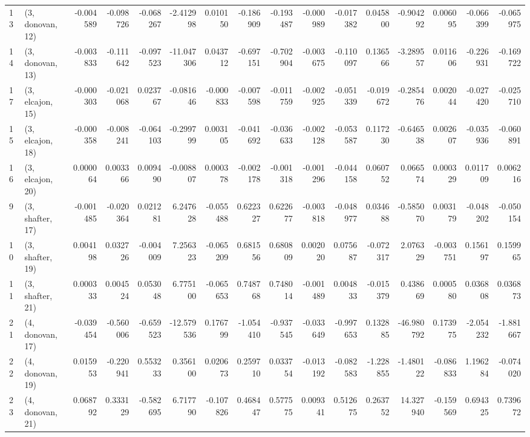 \begin{tabular}{llrrrrrrrrrrrrrr}
13 &  (3, donovan, 12) &  -0.004589 & -0.098726 & -0.068267 &  -2.412998 &  0.010150 &  -0.186909 & -0.193487 & -0.000989 & -0.017382 &  0.045800 &  -0.904292 &  0.006095 & -0.066399 & -0.065975 \\
14 &  (3, donovan, 13) &  -0.003833 & -0.111642 & -0.097523 & -11.047306 &  0.043712 &  -0.697151 & -0.702904 & -0.003675 & -0.110097 &  0.136566 &  -3.289557 &  0.011606 & -0.226931 & -0.169722 \\
17 &  (3, elcajon, 15) &  -0.000303 & -0.021068 &  0.023767 &  -0.081646 & -0.000833 &  -0.007598 & -0.011759 & -0.002925 & -0.051339 & -0.019672 &  -0.285476 &  0.002044 & -0.027420 & -0.025710 \\
15 &  (3, elcajon, 18) &  -0.000358 & -0.008241 & -0.064103 &  -0.299799 &  0.003105 &  -0.041692 & -0.036633 & -0.002128 & -0.053587 &  0.117230 &  -0.646538 &  0.002607 & -0.035936 & -0.060891 \\
16 &  (3, elcajon, 20) &   0.000064 &  0.003366 &  0.009490 &  -0.008807 &  0.000378 &  -0.002178 & -0.001318 & -0.001296 & -0.044158 &  0.060752 &   0.066574 &  0.000329 &  0.011709 &  0.006216 \\
9  &  (3, shafter, 17) &  -0.001485 & -0.020364 &  0.021281 &   6.247628 & -0.055488 &   0.622327 &  0.622677 & -0.003818 & -0.048977 &  0.034688 &  -0.585070 &  0.003179 & -0.048202 & -0.050154 \\
10 &  (3, shafter, 19) &   0.004198 &  0.032726 & -0.004009 &   7.256323 & -0.065209 &   0.681556 &  0.680809 &  0.002020 &  0.075687 & -0.072317 &   2.076329 & -0.003751 &  0.156197 &  0.159965 \\
11 &  (3, shafter, 21) &   0.000333 &  0.004524 &  0.053048 &   6.775100 & -0.065653 &   0.748768 &  0.748014 & -0.001489 &  0.004833 & -0.015379 &   0.438669 &  0.000580 &  0.036808 &  0.036873 \\
21 &  (4, donovan, 17) &  -0.039454 & -0.560006 & -0.659523 & -12.579536 &  0.176799 &  -1.054410 & -0.937545 & -0.033649 & -0.997653 &  0.132885 & -46.980792 &  0.173975 & -2.054232 & -1.881667 \\
22 &  (4, donovan, 19) &   0.015953 & -0.220941 &  0.553233 &   0.356100 &  0.020673 &   0.259710 &  0.033754 & -0.013192 & -0.082583 & -1.228855 &  -1.480122 & -0.086833 &  1.196284 & -0.074020 \\
23 &  (4, donovan, 21) &   0.068792 &  0.333129 & -0.582695 &   6.717790 & -0.107826 &   0.468447 &  0.577575 &  0.009341 &  0.512675 &  0.263752 &  14.327940 & -0.159569 &  0.694325 &  0.739672 \\

\end{tabular}

